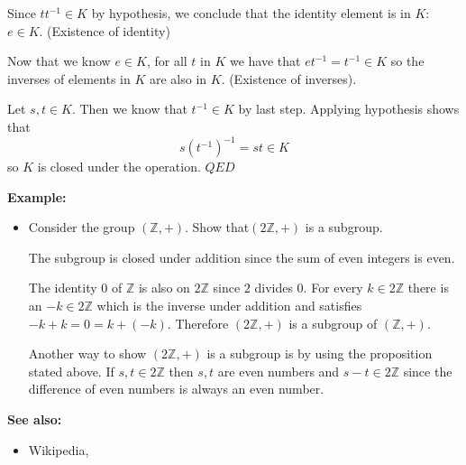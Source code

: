 \documentclass[12pt]{article}
\begin{document}
Since $tt^{-1}\in K$ by hypothesis, we conclude that the identity element is in $K$: $e\in K$. (Existence of identity)

Now that we know $e\in K$, for all $t$ in $K$ we have that $et^{-1}=t^{-1}\in K$ so the inverses of elements in $K $ are also in $K$. (Existence of inverses).

Let $s,t\in K$. Then we know that $t^{-1}\in K$ by last step. Applying hypothesis shows that
$$s(t^{-1})^{-1} = st\in K$$
so $K$ is closed under the operation. $QED$

\textbf{Example:}
\begin{itemize}
  \item Consider the group $(\mathbb{Z}, +)$.  Show that$(2\mathbb{Z}, +)$ is a subgroup. 

The subgroup is closed under addition since the  sum of even integers is even. 

The identity $0$ of $\mathbb{Z}$ is also on $2\mathbb{Z}$ since $2$ divides $0$.
For every $k \in 2\mathbb{Z}$ there is an $-k \in  2\mathbb{Z}$ which is the inverse under addition and satisfies $-k+k = 0 =
  k+(-k)$.  Therefore $(2\mathbb{Z}, +)$ is a subgroup of $(\mathbb{Z},  +)$.

 Another way to show $(2\mathbb{Z}, +)$ is a subgroup
  is by using the proposition stated above.  If $s,t \in
  2\mathbb{Z}$ then $s,t$ are even numbers and $s-t\in
  2\mathbb{Z}$ since the difference of even numbers is always an even number.
\end{itemize}

\textbf{See also:}
\begin{itemize}
\item Wikipedia, 
\end{itemize}
\end{document}
